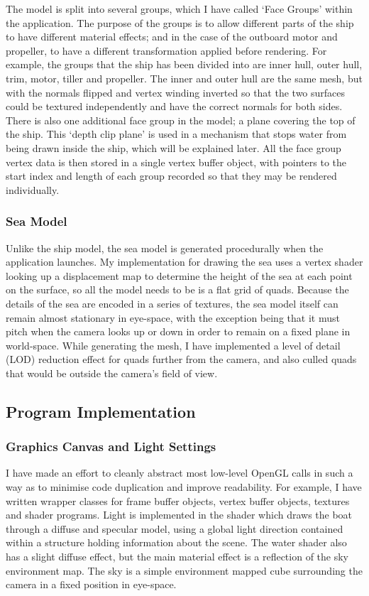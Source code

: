 \documentclass[a4paper,11pt]{article}
\begin{document}
The model is split into several groups, which I have called `Face Groups' within the application. The purpose of the groups is to allow different parts of the ship to have different material effects; and in the case of the outboard motor and propeller, to have a different transformation applied before rendering. For example, the groups that the ship has been divided into are inner hull, outer hull, trim, motor, tiller and propeller. The inner and outer hull are the same mesh, but with the normals flipped and vertex winding inverted so that the two surfaces could be textured independently and have the correct normals for both sides. There is also one additional face group in the model; a plane covering the top of the ship. This `depth clip plane' is used in a mechanism that stops water from being drawn inside the ship, which will be explained later. All the face group vertex data is then stored in a single vertex buffer object, with pointers to the start index and length of each group recorded so that they may be rendered individually.

\subsubsection{Sea Model}
Unlike the ship model, the sea model is generated procedurally when the application launches. My implementation for drawing the sea uses a vertex shader looking up a displacement map to determine the height of the sea at each point on the surface, so all the model needs to be is a flat grid of quads. Because the details of the sea are encoded in a series of textures, the sea model itself can remain almost stationary in eye-space, with the exception being that it must pitch when the camera looks up or down in order to remain on a fixed plane in world-space. While generating the mesh, I have implemented a level of detail (LOD) reduction effect for quads further from the camera, and also culled quads that would be outside the camera's field of view.

\subsection{Program Implementation}
\subsubsection{Graphics Canvas and Light Settings}
I have made an effort to cleanly abstract most low-level OpenGL calls in such a way as to minimise code duplication and improve readability. For example, I have written wrapper classes for frame buffer objects, vertex buffer objects, textures and shader programs. Light is implemented in the shader which draws the boat through a diffuse and specular model, using a global light direction contained within a structure holding information about the scene. The water shader also has a slight diffuse effect, but the main material effect is a reflection of the sky environment map. The sky is a simple environment mapped cube surrounding the camera in a fixed position in eye-space.
\end{document}
